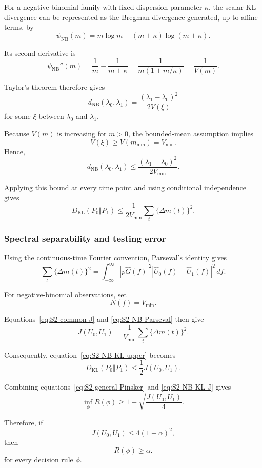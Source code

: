 For a negative-binomial family with fixed dispersion parameter
\(\kappa\), the scalar KL divergence can be represented as the
Bregman divergence generated, up to affine terms, by
\[
\psi_{\mathrm{NB}}(m)
=
m\log m
-
(m+\kappa)\log(m+\kappa).
\]

Its second derivative is
\[
\psi_{\mathrm{NB}}''(m)
=
\frac{1}{m}
-
\frac{1}{m+\kappa}
=
\frac{1}{
m(1+m/\kappa)
}
=
\frac{1}{V(m)}.
\]

Taylor's theorem therefore gives
\begin{equation}
\label{eq:S2-NB-mean-value}
d_{\mathrm{NB}}(\lambda_0,\lambda_1)
=
\frac{
(\lambda_1-\lambda_0)^2
}{
2V(\xi)
}
\end{equation}
for some \(\xi\) between \(\lambda_0\) and \(\lambda_1\).

Because \(V(m)\) is increasing for \(m>0\), the bounded-mean
assumption implies
\[
V(\xi)
\ge
V(m_{\min})
=
V_{\min}.
\]
Hence,
\[
d_{\mathrm{NB}}(\lambda_0,\lambda_1)
\le
\frac{
(\lambda_1-\lambda_0)^2
}{
2V_{\min}
}.
\]

Applying this bound at every time point and using conditional
independence gives
\begin{equation}
\label{eq:S2-NB-KL-upper}
D_{\mathrm{KL}}(P_0\Vert P_1)
\le
\frac{1}{2V_{\min}}
\sum_t
\{\Delta m(t)\}^2.
\end{equation}

\subsubsection{Spectral separability and testing error}

Using the continuous-time Fourier convention, Parseval's identity gives
\begin{equation}
\label{eq:S2-NB-Parseval}
\sum_t
\{\Delta m(t)\}^2
=
\int_{-\infty}^{\infty}
|p\widehat G(f)|^2
\left|
\widehat U_0(f)-\widehat U_1(f)
\right|^2
\,df.
\end{equation}

For negative-binomial observations, set
\[
N(f)=V_{\min}.
\]

Equations~\eqref{eq:S2-common-J} and
\eqref{eq:S2-NB-Parseval} then give
\[
J(U_0,U_1)
=
\frac{1}{V_{\min}}
\sum_t
\{\Delta m(t)\}^2.
\]

Consequently, equation~\eqref{eq:S2-NB-KL-upper} becomes
\begin{equation}
\label{eq:S2-NB-KL-J}
D_{\mathrm{KL}}(P_0\Vert P_1)
\le
\frac{1}{2}J(U_0,U_1).
\end{equation}

Combining equations~\eqref{eq:S2-general-Pinsker} and
\eqref{eq:S2-NB-KL-J} gives
\[
\inf_{\phi}R(\phi)
\ge
1-
\sqrt{
\frac{J(U_0,U_1)}{4}
}.
\]

Therefore, if
\begin{equation}
\label{eq:S2-NB-threshold}
J(U_0,U_1)
\le
4(1-\alpha)^2,
\end{equation}
then
\[
R(\phi)\ge\alpha.
\]
for every decision rule $\phi$.